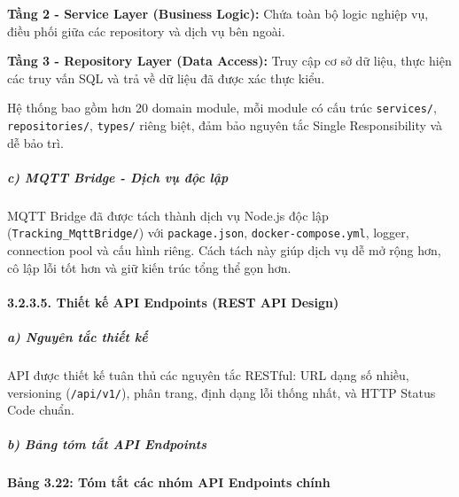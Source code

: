 \documentclass[13pt,a4paper]{extarticle}
\renewcommand{\\}{\thesislongtableorignewline\hline}%
\newcommand{\thesistabletitle}[1]{%
  \begin{center}\textbf{#1}\end{center}%
}
\begin{document}
\textbf{Tầng 2 - Service Layer (Business Logic):} Chứa toàn bộ logic
nghiệp vụ, điều phối giữa các repository và dịch vụ bên ngoài.

\textbf{Tầng 3 - Repository Layer (Data Access):} Truy cập cơ sở dữ
liệu, thực hiện các truy vấn SQL và trả về dữ liệu đã được xác thực
kiểu.

Hệ thống bao gồm hơn 20 domain module, mỗi module có cấu trúc
\texttt{services/}, \texttt{repositories/}, \texttt{types/} riêng biệt,
đảm bảo nguyên tắc Single Responsibility và dễ bảo trì.

\subparagraph{c) MQTT Bridge - Dịch vụ độc
lập}\label{c-mqtt-bridge---dux1ecbch-vux1ee5-ux111ux1ed9c-lux1eadp}

MQTT Bridge đã được tách thành dịch vụ Node.js độc lập
(\texttt{Tracking\_MqttBridge/}) với \texttt{package.json},
\texttt{docker-compose.yml}, logger, connection pool và cấu hình riêng.
Cách tách này giúp dịch vụ dễ mở rộng hơn, cô lập lỗi tốt hơn và giữ
kiến trúc tổng thể gọn hơn.

\paragraph{3.2.3.5. Thiết kế API Endpoints (REST API
Design)}\label{3235-thiux1ebft-kux1ebf-api-endpoints-rest-api-design}

\subparagraph{a) Nguyên tắc thiết
kế}\label{a-nguyuxean-tux1eafc-thiux1ebft-kux1ebf}

API được thiết kế tuân thủ các nguyên tắc RESTful: URL dạng số nhiều,
versioning (\texttt{/api/v1/}), phân trang, định dạng lỗi thống nhất, và
HTTP Status Code chuẩn.

\subparagraph{b) Bảng tóm tắt API
Endpoints}\label{b-bux1ea3ng-tuxf3m-tux1eaft-api-endpoints}

\thesistabletitle{Bảng 3.22: Tóm tắt các nhóm API Endpoints chính}
\end{document}
